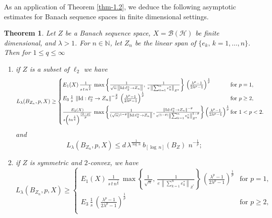 \documentclass[a4paper,11pt, reqno]{amsart}
\newtheorem{thm}{Theorem}[section]
\theoremstyle{definition}
\newcommand{\norm}[1]{\left\lVert#1\right\rVert}
\begin{document}
\medspace
\noindent As an application of Theorem \ref{thm-1.2}, we deduce the following asymptotic estimates for Banach sequence spaces in finite dimensional settings.
\begin{thm} \label{thm-1.3-a}
	Let $Z$ be a Banach sequence space, $X=\mathcal{B}(\mathcal{H})$ be finite dimensional, and $\lambda>1$. For $n\in \mathbb{N}$, let $Z_{n}$ be the linear span of $\{e_{k}, \, k=1,\ldots,n\}$. Then for $1\leq q \leq \infty$
	\begin{enumerate}
		\item if $Z$ is a subset of $\ell_2$ we have \begin{equation*}
			L_{\lambda}(B_{Z_{n}}, p,X) \geq	\begin{cases}
				E_{1}(X)\, \frac{1}{s\,t\, n^{\frac{1}{q}}} \, \max \left\{\frac{1}{\sqrt{n}\, \norm{\mathrm{Id}: \ell^n_{2} \rightarrow Z_{n}}}, \, \frac{1}{e\, \norm{\sum_{k=1}^{n}e^{*}_{k}}_{Z^{*}}}\right\}\, \left(\frac{\lambda^p -1}{2\lambda^p - 1}\right)^{\frac{1}{p}} & \text{for $p=1$}, \\[2mm]
				E_{3}\, \frac{1}{s}\,\norm{\mathrm{Id}:\ell^n _2 \rightarrow Z_{n}}^{-\frac{2}{p}}\, \left(\frac{\lambda^p -1}{2\lambda^p - 1}\right)^{\frac{1}{p}}\, & \text{for $p \geq 2$}, \\[2mm]
				
				\frac{E_{2}(X)}{s\left(t n^{\frac{1}{q}}\right)^{\frac{(2-p)}{p}}}\,  \max \left\{\frac{1}{(\sqrt{n})^{1-\theta} \norm{\mathrm{Id}: \ell^n_{2} \rightarrow Z_{n}}}, \frac{\norm{\mathrm{Id}:\ell^n _2 \rightarrow Z_{n}}^{-\theta}}{e^{(1-\theta)} \norm{\sum_{k=1}^{n}e^{*}_{k}}_{Z^{*}}^{1-\theta}}\right\}\left(\frac{\lambda^p -1}{2\lambda^p - 1}\right)^{\frac{1}{p}} \hspace{-3mm} & \text{for $1<p< 2$}. 
			\end{cases}
		\end{equation*}
		and 
		$$L_{\lambda}(B_{Z_{n}}, p,X) \leq d\,  \lambda^{\frac{1}{\log \,n}}\,b_{[\log\,n]}(B_Z)\, \,n^{-\frac{1}{p}};$$
		\item if $Z$ is symmetric and $2$-convex, we have
		\begin{equation*}
			L_{\lambda}(B_{Z_{n}}, p,X) \geq	\begin{cases}
				E_{1}(X)\, \frac{1}{s\,t\, n^{\frac{1}{q}}} \, \max \left\{\frac{1}{\sqrt{n}}, \, \frac{1}{e\, \norm{\sum_{k=1}^{n}e^{*}_{k}}_{Z^{*}}}\right\}\, \left(\frac{\lambda^p -1}{2\lambda^p - 1}\right)^{\frac{1}{p}} & \text{for $p=1$}, \\[2mm]
				E_{3}\,\frac{1}{s}\, \left(\frac{\lambda^p -1}{2\lambda^p - 1}\right)^{\frac{1}{p}}\, & \text{for $p \geq 2$}, \\[2mm]
				

\end{cases}
\end{equation*}
\end{enumerate}
\end{thm}
\end{document}
